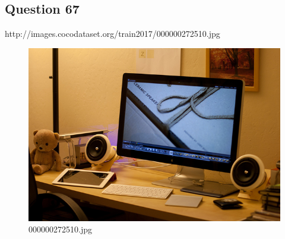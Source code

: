 \subsection*{Question 67}
http://images.cocodataset.org/train2017/000000272510.jpg
\begin{figure}[h]
    \centering
    \includegraphics[width=0.8\linewidth]{../image set/hard/000000272510.jpg}
    \caption{000000272510.jpg}
\end{figure}
